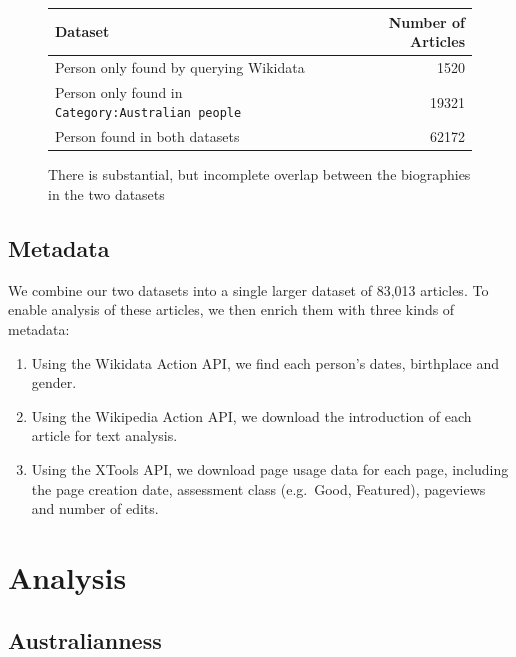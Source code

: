 \documentclass[
  a4paper,
  DIV=11,
  numbers=noendperiod]{scrreprt}
\providecommand{\tightlist}{%
  \setlength{\itemsep}{0pt}\setlength{\parskip}{0pt}}\usepackage{longtable,booktabs,array}
\begin{document}
\begin{figure}

{\centering 

\begin{longtable}[]{@{}lr@{}}
\toprule\noalign{}
Dataset & Number of Articles \\
\midrule\noalign{}
\endhead
\bottomrule\noalign{}
\endlastfoot
Person only found by querying Wikidata & 1520 \\
Person only found in \texttt{Category:Australian\ people} & 19321 \\
Person found in both datasets & 62172 \\
\end{longtable}

}

\caption{\label{fig-biography-overlap-table}There is substantial, but
incomplete overlap between the biographies in the two datasets}

\end{figure}

\hypertarget{metadata}{%
\section{Metadata}\label{metadata}}

We combine our two datasets into a single larger dataset of 83,013
articles. To enable analysis of these articles, we then enrich them with
three kinds of metadata:

\begin{enumerate}
\def\labelenumi{\arabic{enumi}.}
\tightlist
\item
  Using the Wikidata Action API, we find each person's dates, birthplace
  and gender.
\item
  Using the Wikipedia Action API, we download the introduction of each
  article for text analysis.
\item
  Using the XTools API, we download page usage data for each page,
  including the page creation date, assessment class (e.g.~Good,
  Featured), pageviews and number of edits.
\end{enumerate}

\hypertarget{analysis}{%
\chapter{Analysis}\label{analysis}}

\hypertarget{australianness}{%
\section{Australianness}\label{australianness}}
\end{document}
